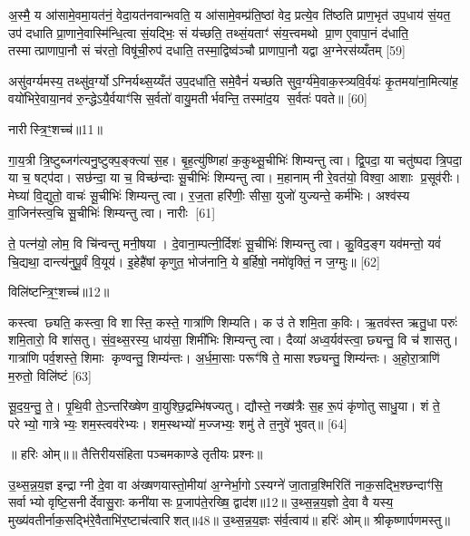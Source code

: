 अ॒स्मै॒ य आ॑सामे॒वमा॒यत॑नं॒ वेदा॒यत॑नवान्भवति॒ य आ॑सामे॒वम्प्र॑ति॒ष्ठां वेद॒ प्रत्ये॒व ति॑ष्ठति प्राण॒भृत॑ उप॒धाय॑ सं॒यत॒ उप॑ दधाति प्रा॒णाने॒वास्मि॑न्धि॒त्वा सं॒यद्भिः॒ सं य॑च्छति॒ तथ्सं॒यताꣳ॑ संय॒त्त्वमथो प्रा॒ण ए॒वापा॒नं द॑धाति॒ तस्मात्प्राणापा॒नौ सं च॑रतो॒ विषू॑ची॒रुप॑ दधाति॒ तस्मा॒द्विष्व॑ञ्चौ प्राणापा॒नौ यद्वा अ॒ग्नेरस॑य्यँतम् [59]

असु॑वर्ग्यमस्य॒ तथ्सु॑व॒र्ग्योऽग्निर्यथ्स॒य्यँत॑ उप॒दधा॑ति॒ समे॒वैनं॑ यच्छति सुव॒र्ग्य॑मे॒वाक॒स्त्र्यवि॒र्वयः॑ कृ॒तमया॑ना॒मित्या॑ह॒ वयो॑भिरे॒वाया॒नव॑ रु॒न्द्धेऽयै॒र्वयाꣳ॑सि स॒र्वतो॑ वायु॒मतीर्भवन्ति॒ तस्मा॑द॒य स॒र्वतः॑ पवते॥ [60]

{\scriptsize {नारीस्त्रि॒ꣳ॒शच्च॑॥11॥}}

गा॒य॒त्री त्रि॒ष्टुब्जग॑त्यनु॒ष्टुक्प॒ङ्क्त्या॑ स॒ह। बृ॒ह॒त्यु॑ष्णिहा॑ क॒कुथ्सू॒चीभिः॑ शिम्यन्तु त्वा। द्वि॒पदा॒ या चतु॑ष्पदा त्रि॒पदा॒ या च॒ षट्प॑दा। सछ॑न्दा॒ या च॒ विच्छ॑न्दाः सू॒चीभिः॑ शिम्यन्तु त्वा। म॒हानाम्नी रे॒वत॑यो॒ विश्वा॒ आशाः प्र॒सूव॑रीः। मेघ्या॑ वि॒द्युतो॒ वाचः॑ सू॒चीभिः॑ शिम्यन्तु त्वा। र॒ज॒ता हरि॑णीः॒ सीसा॒ युजो॑ युज्यन्ते॒ कर्म॑भिः। अश्व॑स्य वा॒जिन॑स्त्व॒चि सू॒चीभिः॑ शिम्यन्तु त्वा। नारीः [61]

ते॒ पत्न॑यो॒ लोम॒ वि चि॑न्वन्तु मनी॒षया। दे॒वाना॒म्पत्नी॒र्दिशः॑ सू॒चीभिः॑ शिम्यन्तु त्वा। कु॒विद॒ङ्ग यव॑मन्तो॒ यवं॑ चि॒द्यथा॒ दान्त्य॑नुपू॒र्वं वि॒यूय॑। इ॒हेहै॑षां कृणुत॒ भोज॑नानि॒ ये ब॒र्\mbox{}हिषो॒ नमो॑वृक्तिं॒ न ज॒ग्मुः॥ [62]

{\scriptsize {विलि॑ष्टन्त्रि॒ꣳ॒शच्च॑॥12॥}}

कस्त्वा छ्यति॒ कस्त्वा॒ वि शास्ति॒ कस्ते॒ गात्रा॑णि शिम्यति। क उ॑ ते शमि॒ता क॒विः। ऋ॒तव॑स्त ऋतु॒धा परुः॑ शमि॒तारो॒ वि शा॑सतु। सं॒व॒थ्स॒रस्य॒ धाय॑सा॒ शिमी॑भिः शिम्यन्तु त्वा। दैव्या॑ अध्व॒र्यव॑स्त्वा॒ छ्यन्तु॒ वि च॑ शासतु। गात्रा॑णि पर्व॒शस्ते॒ शिमाः कृण्वन्तु॒ शिम्य॑न्तः। अ॒र्ध॒मा॒साः परूꣳ॑षि ते॒ मासाश्छ्यन्तु॒ शिम्य॑न्तः। अ॒हो॒रा॒त्राणि॑ म॒रुतो॒ विलि॑ष्टं [63]

सू॒द॒य॒न्तु॒ ते॒। पृ॒थि॒वी ते॒ऽन्तरि॑ख्षेण वा॒युश्छि॒द्रम्भि॑षज्यतु। द्यौस्ते॒ नख्ष॑त्रैः स॒ह रू॒पं कृ॑णोतु साधु॒या। शं ते॒ परेभ्यो॒ गात्रेभ्यः॒ शम॒स्त्वव॑रेभ्यः। शम॒स्थभ्यो॑ म॒ज्जभ्यः॒ शमु॑ ते त॒नुवे॑ भुवत्॥ [64]

{\scriptsize {॥ हरिः ओम्॥॥ तैत्तिरीयसंहिता पञ्चमकाण्डे तृतीयः प्रश्नः॥}}

{\scriptsize {उ॒थ्स॒न्न॒य॒ज्ञ इन्द्राग्नी दे॒वा वा अ॑ख्षणयास्तो॒मीया॑ अ॒ग्नेर्भा॒गोऽस्यग्ने॑ जा॒तान्र॒श्मिरिति॑ नाक॒सद्भि॒श्छन्दाꣳ॑सि॒ सर्वाभ्यो वृष्टि॒सनीर्देवासु॒राः कनी॑यासः प्र॒जाप॑ते॒रख्षि॒ द्वाद॑श॥12॥ उ॒थ्स॒न्न॒य॒ज्ञो दे॒वा वै यस्य॒ मुख्य॑वतीर्नाक॒सद्भि॑रे॒वैताभि॑र॒ष्टाच॑त्वारिशत्॥48॥ उ॒थ्स॒न्न॒य॒ज्ञः स॑र्व॒त्वाय॑॥ हरिः॑ ओम्॥ श्रीकृष्णार्पणमस्तु॥}}


